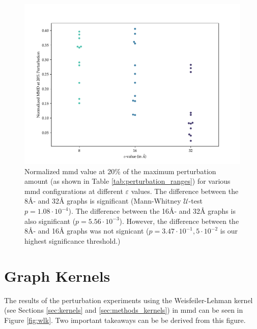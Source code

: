 \begin{figure}
  \centering
  \includegraphics[width=\textwidth]{./figures/results/swarmplot_2_1.pdf}
  \caption[Normalized \gls{mmd} value at 20\% of the maximum perturbation amount for
various \gls{mmd} configurations at different $\varepsilon$ values.]{Normalized \gls{mmd}
value at 20\% of the maximum perturbation amount (as shown in Table
\ref{tab:perturbation_ranges}) for various \gls{mmd} configurations at different
$\varepsilon$ values. The difference between the 8\si{\angstrom}- and
32\si{\angstrom} graphs is significant (Mann-Whitney $\mathcal{U}$-test
$p=1.08\cdot 10^{-4}$). The difference between the 16\si{\angstrom}- and
32\si{\angstrom} graphs is also significant ($p=5.56\cdot 10^{-3}$). However,
the difference between the 8\si{\angstrom}- and 16\si{\angstrom} graphs was not
signicant ($p=3.47\cdot 10^{-1}, 5\cdot 10^{-2}$ is our highest significance
threshold.)}
  \label{fig:difference_sensitivity_20_percent}
\end{figure}

\clearpage


\section{Graph Kernels}\label{sec:results_graph_kernels}

The results of the perturbation experiments using the Weisfeiler-Lehman kernel
(see Sections \ref{sec:kernels} and \ref{sec:methods_kernels}) in \gls{mmd} can be
seen in Figure \ref{fig:wlk}. Two important takeaways can be be derived from
this figure.

